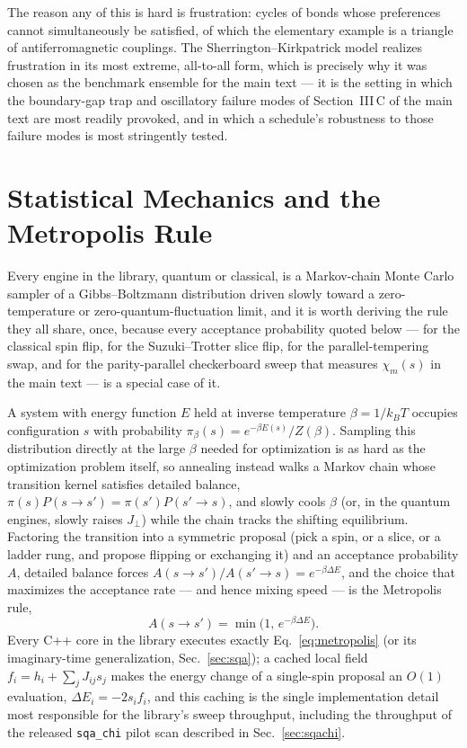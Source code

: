 \documentclass[11pt]{article}
\newcommand{\chim}{\chi_{m}}
\begin{document}
The reason any of this is hard is frustration: cycles of bonds whose preferences cannot
simultaneously be satisfied, of which the elementary example is a triangle of antiferromagnetic
couplings. The Sherrington--Kirkpatrick model realizes frustration in its most extreme,
all-to-all form, which is precisely why it was chosen as the benchmark ensemble for the main
text --- it is the setting in which the boundary-gap trap and oscillatory failure modes of
Section~III\,C of the main text are most readily provoked, and in which a schedule's robustness
to those failure modes is most stringently tested.

\section{Statistical Mechanics and the Metropolis Rule}
\label{sec:statmech}

Every engine in the library, quantum or classical, is a Markov-chain Monte Carlo sampler of a
Gibbs--Boltzmann distribution driven slowly toward a zero-temperature or zero-quantum-fluctuation
limit, and it is worth deriving the rule they all share, once, because every acceptance
probability quoted below --- for the classical spin flip, for the Suzuki--Trotter slice flip, for
the parallel-tempering swap, and for the parity-parallel checkerboard sweep that measures
$\chim(s)$ in the main text --- is a special case of it.

A system with energy function $E$ held at inverse temperature $\beta=1/k_BT$ occupies
configuration $s$ with probability $\pi_\beta(s)=e^{-\beta E(s)}/Z(\beta)$. Sampling this
distribution directly at the large $\beta$ needed for optimization is as hard as the optimization
problem itself, so annealing instead walks a Markov chain whose transition kernel satisfies
detailed balance, $\pi(s)P(s\to s') = \pi(s')P(s'\to s)$, and slowly cools $\beta$ (or, in the
quantum engines, slowly raises $J_\perp$) while the chain tracks the shifting equilibrium.
Factoring the transition into a symmetric proposal (pick a spin, or a slice, or a ladder rung, and
propose flipping or exchanging it) and an acceptance probability $A$, detailed balance forces
$A(s\to s')/A(s'\to s) = e^{-\beta\Delta E}$, and the choice that maximizes the acceptance rate
--- and hence mixing speed --- is the Metropolis rule,
\begin{equation}
A(s\to s') = \min\!\big(1,\, e^{-\beta\Delta E}\big).
\label{eq:metropolis}
\end{equation}
Every C++ core in the library executes exactly Eq.~\eqref{eq:metropolis} (or its imaginary-time
generalization, Sec.~\ref{sec:sqa}); a cached local field $f_i=h_i+\sum_j J_{ij}s_j$ makes the
energy change of a single-spin proposal an $O(1)$ evaluation, $\Delta E_i=-2s_if_i$, and this
caching is the single implementation detail most responsible for the library's sweep throughput,
including the throughput of the released \texttt{sqa\_chi} pilot scan described in
Sec.~\ref{sec:sqachi}.
\end{document}
